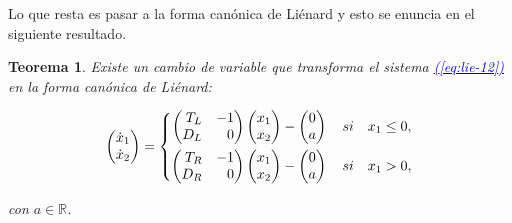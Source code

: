 \documentclass[12pt,a4paper]{report} %
\newtheorem{theorem}{Teorema}[chapter]
\newcommand{\eref}[1]{\hyperref[#1]{\textcolor{blue}{(\ref*{#1})}}}
\begin{document}
	\vspace{0.5cm} Lo que resta es pasar a la forma canónica de Liénard y esto se enuncia en el siguiente resultado.
	

	
	\vspace{0.5cm}\begin{theorem}\label{t2}
		Existe un cambio de variable que transforma el sistema \eref{eq:lie-12} en la forma canónica de Liénard:
	
	\begin{equation}
		\begin{pmatrix*}[r]
			\dot{x}_1 \\ \dot{x}_2
		\end{pmatrix*}=
		\label{eq:lienard}
		\scalebox{1}{$\displaystyle
			\left\{
			\begin{aligned}
				\begin{pmatrix*}[r]
					T_L & -1\\
					D_L & 0
				\end{pmatrix*}\begin{pmatrix*}[r]
				x_1\\x_2
				\end{pmatrix*}-\begin{pmatrix}
				0\\a
				\end{pmatrix} \quad si \quad x_1\leq 0, \\
				\begin{pmatrix*}[r]
					T_R & -1\\
					D_R & 0
				\end{pmatrix*}\begin{pmatrix*}[r]
				x_1\\x_2
				\end{pmatrix*}-\begin{pmatrix}
					0\\a
				\end{pmatrix} \quad si \quad x_1 > 0,
			\end{aligned}
			\right.
			$}
	\end{equation}
	
	\noindent con $a\in \mathbb{R}$.
	\end{theorem}
\end{document}
